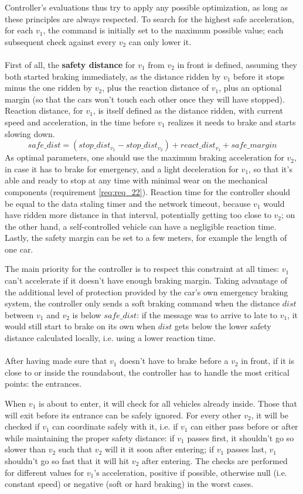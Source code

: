 Controller's evaluations thus try to apply any possible optimization, as long as
these principles are always respected. To search for the highest safe
acceleration, for each $v_1$, the command is initially set to the maximum
possible value; each subsequent check against every $v_2$ can only lower it.
\\
\\
First of all, the \textbf{safety distance} for $v_1$ from $v_2$ in front is
defined, assuming they both started braking immediately, as the distance ridden
by $v_1$ before it stops minus the one ridden by $v_2$, plus the reaction
distance of $v_1$, plus an optional margin (so that the cars won't touch each
other once they will have stopped). Reaction distance, for $v_1$, is itself
defined as the distance ridden, with current speed and acceleration, in the time
before $v_1$ realizes it needs to brake and starts slowing down.
\[
  safe\_dist = (stop\_dist_{v_1} - stop\_dist_{v_2}) + react\_dist_{v_1} + safe\_margin
\]
As optimal parameters, one should use the maximum braking acceleration for
$v_2$, in case it has to brake for emergency, and a light deceleration for
$v_1$, so that it's able and ready to stop at any time with minimal wear on the
mechanical components (requirement \ref{req:req_22}). Reaction time for the
controller should be equal to the data staling timer and the network timeout,
because $v_1$ would have ridden more distance in that interval, potentially
getting too close to $v_2$; on the other hand, a self-controlled vehicle can
have a negligible reaction time. Lastly, the safety margin can be set to a few
meters, for example the length of one car.

The main priority for the controller is to respect this constraint at all times:
$v_1$ can't accelerate if it doesn't have enough braking margin. Taking
advantage of the additional level of protection provided by the car's own
emergency braking system, the controller only sends a soft braking command when
the distance $dist$ between $v_1$ and $v_2$ is below $safe\_dist$: if the
message was to arrive to late to $v_1$, it would still start to brake on its own
when $dist$ gets below the lower safety distance calculated locally, i.e. using
a lower reaction time.
\\
\\
After having made sure that $v_1$ doesn't have to brake before a $v_2$ in front,
if it is close to or inside the roundabout, the controller has to handle the
most critical points: the entrances.

When $v_1$ is about to enter, it will check for all vehicles already inside.
Those that will exit before its entrance can be safely ignored. For every other
$v_2$, it will be checked if $v_1$ can coordinate safely with it, i.e. if $v_1$
can either pass before or after while maintaining the proper safety distance: if
$v_1$ passes first, it shouldn't go so slower than $v_2$ such that $v_2$ will it
it soon after entering; if $v_1$ passes last, $v_1$ shouldn't go so fast that it
will hit $v_2$ after entering. The checks are performed for different values for
$v_1$'s acceleration, positive if possible, otherwise null (i.e. constant speed)
or negative (soft or hard braking) in the worst cases.

